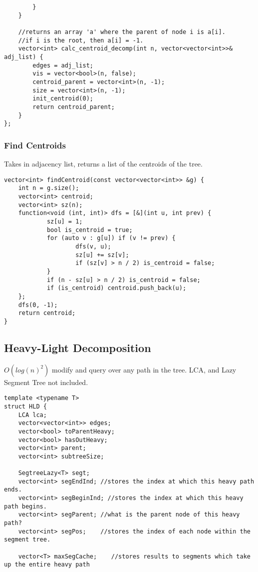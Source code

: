 \documentclass[8pt, headheight=10pt, a4paper]{article}
\begin{document}
\begin{multicols*}{3}
\begin{lstlisting}
        }
    }

    //returns an array 'a' where the parent of node i is a[i]. 
    //if i is the root, then a[i] = -1. 
    vector<int> calc_centroid_decomp(int n, vector<vector<int>>& adj_list) {
        edges = adj_list;
        vis = vector<bool>(n, false);
        centroid_parent = vector<int>(n, -1);
        size = vector<int>(n, -1);
        init_centroid(0);
        return centroid_parent;
    }
};
\end{lstlisting}

\subsubsection{Find Centroids}
Takes in adjacency list, returns a list of the centroids of the tree. 
\begin{lstlisting}
vector<int> findCentroid(const vector<vector<int>> &g) {
    int n = g.size();
    vector<int> centroid;
    vector<int> sz(n);
    function<void (int, int)> dfs = [&](int u, int prev) {
            sz[u] = 1;
            bool is_centroid = true;
            for (auto v : g[u]) if (v != prev) {
                    dfs(v, u);
                    sz[u] += sz[v];
                    if (sz[v] > n / 2) is_centroid = false;
            }
            if (n - sz[u] > n / 2) is_centroid = false;
            if (is_centroid) centroid.push_back(u);
    };
    dfs(0, -1);
    return centroid;
}
\end{lstlisting}

\subsection{Heavy-Light Decomposition}
$O(log(n)^2)$ modify and query over any path in the tree. LCA, and Lazy Segment Tree not included. 
\begin{lstlisting}
template <typename T>
struct HLD {
    LCA lca;
    vector<vector<int>> edges;
    vector<bool> toParentHeavy;
    vector<bool> hasOutHeavy;
    vector<int> parent;
    vector<int> subtreeSize;

    SegtreeLazy<T> segt;
    vector<int> segEndInd; //stores the index at which this heavy path ends. 
    vector<int> segBeginInd; //stores the index at which this heavy path begins.
    vector<int> segParent; //what is the parent node of this heavy path?
    vector<int> segPos;    //stores the index of each node within the segment tree. 

    vector<T> maxSegCache;    //stores results to segments which take up the entire heavy path


\end{lstlisting}
\end{multicols*}
\end{document}
